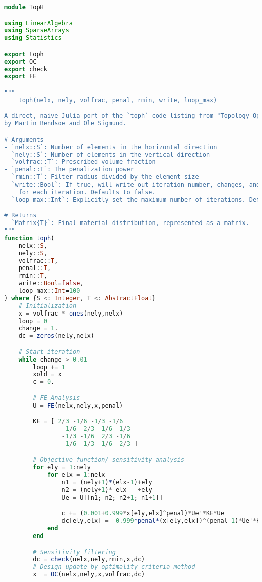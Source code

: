 \begin{lstlisting}[language=Julia, title=\texttt{toph.jl}]
module TopH

using LinearAlgebra
using SparseArrays
using Statistics

export toph
export OC
export check
export FE

"""
    toph(nelx, nely, volfrac, penal, rmin, write, loop_max)

A direct, naive Julia port of the `toph` code listing from "Topology Optimization"
by Martin Bendsoe and Ole Sigmund.

# Arguments
- `nelx::S`: Number of elements in the horizontal direction
- `nely::S`: Number of elements in the vertical direction
- `volfrac::T`: Prescribed volume fraction
- `penal::T`: The penalization power
- `rmin::T`: Filter radius divided by the element size
- `write::Bool`: If true, will write out iteration number, changes, and density
    for each iteration. Defaults to false.
- `loop_max::Int`: Explicitly set the maximum number of iterations. Defaults to 1000.

# Returns
- `Matrix{T}`: Final material distribution, represented as a matrix.
"""
function toph(
    nelx::S,
    nely::S,
    volfrac::T,
    penal::T,
    rmin::T,
    write::Bool=false, 
    loop_max::Int=100
) where {S <: Integer, T <: AbstractFloat}
    # Initialization
    x = volfrac * ones(nely,nelx)
    loop = 0
    change = 1.
    dc = zeros(nely,nelx)

    # Start iteration
    while change > 0.01
        loop += 1
        xold = x
        c = 0.

        # FE Analysis
        U = FE(nelx,nely,x,penal)

        KE = [ 2/3 -1/6 -1/3 -1/6
                -1/6  2/3 -1/6 -1/3
                -1/3 -1/6  2/3 -1/6
                -1/6 -1/3 -1/6  2/3 ]

        # Objective function/ sensitivity analysis
        for ely = 1:nely
            for elx = 1:nelx
                n1 = (nely+1)*(elx-1)+ely
                n2 = (nely+1)* elx   +ely
                Ue = U[[n1; n2; n2+1; n1+1]]

                c += (0.001+0.999*x[ely,elx]^penal)*Ue'*KE*Ue
                dc[ely,elx] = -0.999*penal*(x[ely,elx])^(penal-1)*Ue'*KE*Ue
            end
        end

        # Sensitivity filtering 
        dc = check(nelx,nely,rmin,x,dc)
        # Design update by optimality criteria method
        x  = OC(nelx,nely,x,volfrac,dc)


\end{lstlisting}
